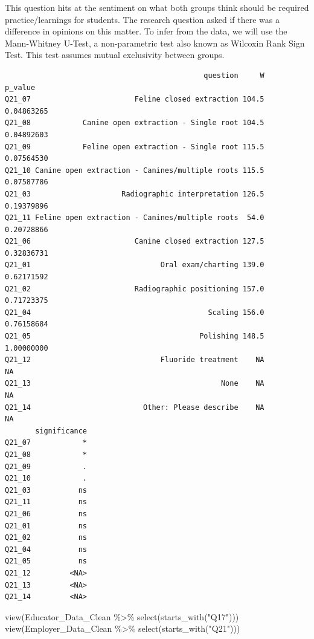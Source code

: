 \documentclass[
  11pt,
  letterpaper,
  DIV=11,
  numbers=noendperiod]{scrartcl}
\newenvironment{Shaded}{\begin{snugshade}}{\end{snugshade}}
\newcommand{\FunctionTok}[1]{\textcolor[rgb]{0.28,0.35,0.67}{#1}}
\newcommand{\NormalTok}[1]{\textcolor[rgb]{0.00,0.23,0.31}{#1}}
\newcommand{\SpecialCharTok}[1]{\textcolor[rgb]{0.37,0.37,0.37}{#1}}
\newcommand{\StringTok}[1]{\textcolor[rgb]{0.13,0.47,0.30}{#1}}
\numberwithin{figure}{section}
\begin{document}
This question hits at the sentiment on what both groups think should be
required practice/learnings for students. The research question asked if
there was a difference in opinions on this matter. To infer from the
data, we will use the Mann-Whitney U-Test, a non-parametric test also
known as Wilcoxin Rank Sign Test. This test assumes mutual exclusivity
between groups.

\begin{verbatim}
                                              question     W    p_value
Q21_07                        Feline closed extraction 104.5 0.04863265
Q21_08            Canine open extraction - Single root 104.5 0.04892603
Q21_09            Feline open extraction - Single root 115.5 0.07564530
Q21_10 Canine open extraction - Canines/multiple roots 115.5 0.07587786
Q21_03                     Radiographic interpretation 126.5 0.19379896
Q21_11 Feline open extraction - Canines/multiple roots  54.0 0.20728866
Q21_06                        Canine closed extraction 127.5 0.32836731
Q21_01                              Oral exam/charting 139.0 0.62171592
Q21_02                        Radiographic positioning 157.0 0.71723375
Q21_04                                         Scaling 156.0 0.76158684
Q21_05                                       Polishing 148.5 1.00000000
Q21_12                              Fluoride treatment    NA         NA
Q21_13                                            None    NA         NA
Q21_14                          Other: Please describe    NA         NA
       significance
Q21_07            *
Q21_08            *
Q21_09            .
Q21_10            .
Q21_03           ns
Q21_11           ns
Q21_06           ns
Q21_01           ns
Q21_02           ns
Q21_04           ns
Q21_05           ns
Q21_12         <NA>
Q21_13         <NA>
Q21_14         <NA>
\end{verbatim}

\begin{Shaded}
\begin{Highlighting}[]
\FunctionTok{view}\NormalTok{(Educator\_Data\_Clean }\SpecialCharTok{\%\textgreater{}\%} \FunctionTok{select}\NormalTok{(}\FunctionTok{starts\_with}\NormalTok{(}\StringTok{"Q17"}\NormalTok{)))}
\FunctionTok{view}\NormalTok{(Employer\_Data\_Clean }\SpecialCharTok{\%\textgreater{}\%} \FunctionTok{select}\NormalTok{(}\FunctionTok{starts\_with}\NormalTok{(}\StringTok{"Q21"}\NormalTok{)))}
\end{Highlighting}
\end{Shaded}
\end{document}
